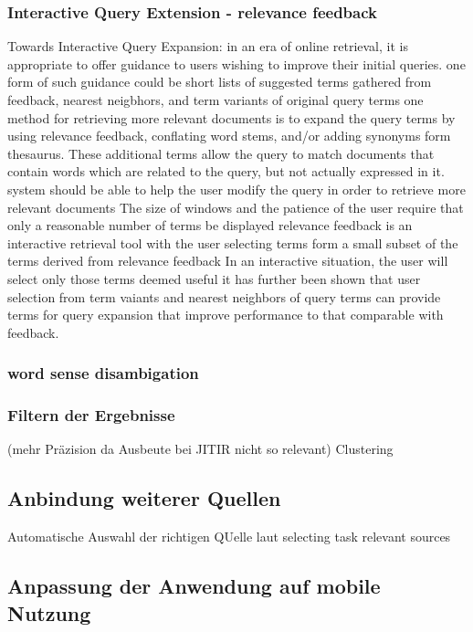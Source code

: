    \subsubsection{Interactive Query Extension - relevance feedback}
 				Towards Interactive Query Expansion:
  in an era of online retrieval, it is appropriate to offer guidance to users wishing to improve their initial queries. one form of such guidance could be short lists of suggested terms gathered from feedback, nearest neigbhors, and term variants of original query terms
  one method for retrieving more relevant documents is to expand the query terms by using relevance feedback, conflating word stems, and/or adding synonyms form thesaurus. These additional terms allow the query to match documents that contain words which are related to the query, but not actually expressed in it. 
  system should be able to help the user modify the query in order to retrieve more relevant documents
  The size of windows and the patience of the user require that only a reasonable number of terms be displayed
  relevance feedback is an interactive retrieval tool
  with the user selecting terms form a small subset of the terms derived from relevance feedback
  In an interactive situation, the user will select only those terms deemed useful
  it has further been shown that user selection from term vaiants and nearest neighbors of query terms can provide terms for query expansion that improve performance to that comparable with feedback.


  \subsubsection{word sense disambigation}
	 \cite{budzik2000user}

  \subsubsection{Filtern der Ergebnisse}
 		(mehr Präzision da Ausbeute bei JITIR nicht so relevant) Clustering\cite{budzik2000user}

  \subsection{Anbindung weiterer Quellen}
	Automatische Auswahl der richtigen QUelle laut selecting task relevant sources

 \subsection{Anpassung der Anwendung auf mobile Nutzung}